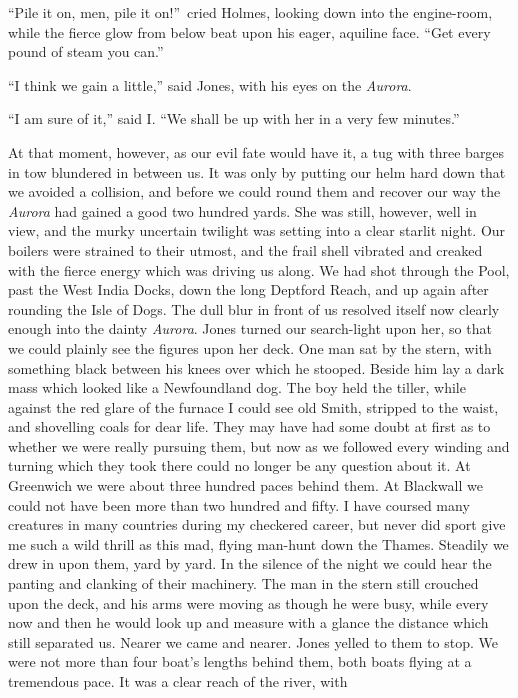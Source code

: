 \documentclass[12pt,english,oneside]{book}
\begin{document}
{}``Pile it on, men, pile it on!''\ cried Holmes, looking down
into the engine-room, while the fierce glow from below beat upon his
eager, aquiline face. {}``Get every pound of steam you can.''

{}``I think we gain a little,'' said Jones, with his eyes on the
\emph{Aurora}.

{}``I am sure of it,'' said I. {}``We shall be up with her in a
very few minutes.''

At that moment, however, as our evil fate would have it, a tug with
three barges in tow blundered in between us. It was only by putting
our helm hard down that we avoided a collision, and before we could
round them and recover our way the \emph{Aurora} had gained a good
two hundred yards. She was still, however, well in view, and the murky
uncertain twilight was setting into a clear starlit night. Our boilers
were strained to their utmost, and the frail shell vibrated and creaked
with the fierce energy which was driving us along. We had shot through
the Pool, past the West India Docks, down the long Deptford Reach,
and up again after rounding the Isle of Dogs. The dull blur in front
of us resolved itself now clearly enough into the dainty \emph{Aurora}.
Jones turned our search-light upon her, so that we could plainly see
the figures upon her deck. One man sat by the stern, with something
black between his knees over which he stooped. Beside him lay a dark
mass which looked like a Newfoundland dog. The boy held the tiller,
while against the red glare of the furnace I could see old Smith,
stripped to the waist, and shovelling coals for dear life. They may
have had some doubt at first as to whether we were really pursuing
them, but now as we followed every winding and turning which they
took there could no longer be any question about it. At Greenwich
we were about three hundred paces behind them. At Blackwall we could
not have been more than two hundred and fifty. I have coursed many
creatures in many countries during my checkered career, but never
did sport give me such a wild thrill as this mad, flying man-hunt
down the Thames. Steadily we drew in upon them, yard by yard. In the
silence of the night we could hear the panting and clanking of their
machinery. The man in the stern still crouched upon the deck, and
his arms were moving as though he were busy, while every now and then
he would look up and measure with a glance the distance which still
separated us. Nearer we came and nearer. Jones yelled to them to stop.
We were not more than four boat's lengths behind them, both boats
flying at a tremendous pace. It was a clear reach of the river, with
\end{document}
